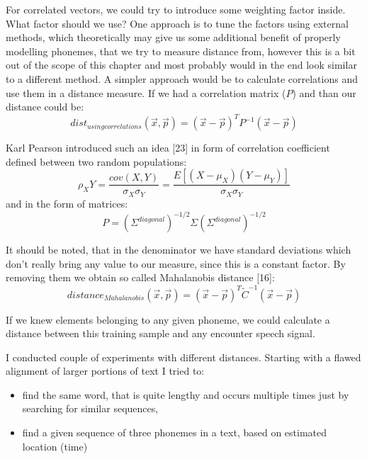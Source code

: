 \documentclass[12pt,a4paper,english]{article}
\begin{document}
For correlated vectors, we could try to introduce some weighting factor inside.\newline
What factor should we use?\newline
One approach is to tune the factors using external methods, which theoretically may give us some additional benefit of properly modelling phonemes, that we try to measure distance from, however this is a bit out of the scope of this chapter and most probably would in the end look similar to a different method.
A simpler approach would be to calculate correlations and use them in a distance measure.
If we had a correlation matrix ($P$) and than our distance could be:
\begin{equation}
    dist_{using correlations}(\vec x, \vec p) = (\vec x - \vec p)^T P^{-1} (\vec x - \vec p)
\end{equation}
               
Karl Pearson introduced such an idea [23] in form of correlation coefficient defined between two random populations:  
\begin{equation}
    \rho_XY = \frac{cov(X, Y)}{\sigma_X \sigma_Y} = \frac{E[(X - \mu_X)(Y - \mu_Y)]}{\sigma_X \sigma_Y}
\end{equation}
and in the form of matrices:  
\begin{equation}
    P = (\Sigma^{diagonal})^{-1/2} \Sigma (\Sigma^{diagonal})^{-1/2}
\end{equation}

It should be noted, that in the denominator we have standard deviations which don't really bring any value to our measure, since this is a constant factor.
By removing them we obtain so called Mahalanobis distance [16]:
\begin{equation}
    distance_{Mahalanobis}(\vec x, \vec p) = (\vec x - \vec p)^T \tilde C^{-1} (\vec x - \vec p)
\end{equation}

If we knew elements belonging to any given phoneme, we could calculate a distance between this training sample and any encounter speech signal.

\newpage

I conducted couple of experiments with different distances.
Starting with a flawed alignment of larger portions of text I tried to:
\begin{itemize}
	\item find the same word, that is quite lengthy and occurs multiple times just by searching for similar sequences,
	\item find a given sequence of three phonemes in a text, based on estimated location (time)
\end{itemize}
\end{document}
